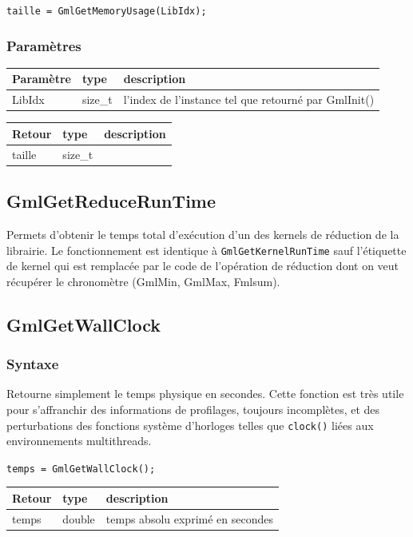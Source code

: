 \documentclass[a4paper,12pt]{article}
\begin{document}
{\tt taille = GmlGetMemoryUsage(LibIdx);}

\subsubsection*{Paramètres}

\begin{tabular}{|m{2cm}|m{1.5cm}|m{10.5cm}|}
\hline
Paramètre  & type    & description \\
\hline
LibIdx     & size\_t & l'index de l'instance tel que retourné par GmlInit() \\
\hline
\end{tabular}

\medskip

\begin{tabular}{|m{2cm}|m{1.5cm}|m{10.5cm}|}
\hline
Retour     & type    & description \\
\hline
taille     & size\_t & \\
\hline
\end{tabular}


\subsection{GmlGetReduceRunTime}

Permets d'obtenir le temps total d'exécution d'un des kernels de réduction de la librairie.
Le fonctionnement est identique à {\tt GmlGetKernelRunTime} sauf l'étiquette de kernel qui est remplacée par le code de l'opération de réduction dont on veut récupérer le chronomètre (GmlMin, GmlMax, Fmlsum).


\subsection{GmlGetWallClock}

\subsubsection*{Syntaxe}

Retourne simplement le temps physique en secondes.
Cette fonction est très utile pour s'affranchir des informations de profilages, toujours incomplètes, et des perturbations des fonctions système d'horloges telles que {\tt clock()} liées aux environnements multithreads.

{\tt temps = GmlGetWallClock();}

\begin{tabular}{|m{2cm}|m{1.5cm}|m{10.5cm}|}
\hline
Retour     & type    & description \\
\hline
temps      & double & temps absolu exprimé en secondes\\
\hline
\end{tabular}
\end{document}
